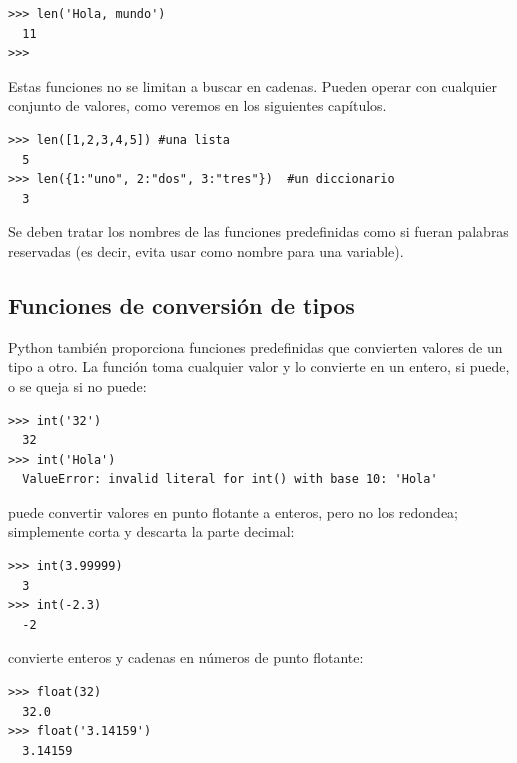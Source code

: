 \begin{Verbatim}[frame=single]
>>> len('Hola, mundo')
  11
>>>
\end{Verbatim}

Estas funciones no se limitan a buscar en cadenas. Pueden operar con
cualquier conjunto de valores, como veremos en los siguientes capítulos.

\begin{Verbatim}[frame=single]
>>> len([1,2,3,4,5]) #una lista
  5
>>> len({1:"uno", 2:"dos", 3:"tres"})  #un diccionario
  3
\end{Verbatim}

Se deben tratar los nombres de las funciones predefinidas como si fueran palabras reservadas (es decir, evita usar  como nombre para una variable).

\hypertarget{funciones-de-conversiuxf3n-de-tipos}{%
\subsection{Funciones de conversión de
tipos}\label{funciones-de-conversiuxf3n-de-tipos}}

 

Python también proporciona funciones predefinidas que convierten valores de
un tipo a otro. La función  toma cualquier valor y lo
convierte en un entero, si puede, o se queja si no puede:

 

\begin{Verbatim}[frame=single]
>>> int('32')
  32
>>> int('Hola')
  ValueError: invalid literal for int() with base 10: 'Hola'
\end{Verbatim}

 puede convertir valores en punto flotante a enteros, pero
no los redondea; simplemente corta y descarta la parte decimal:

\begin{Verbatim}[frame=single]
>>> int(3.99999)
  3
>>> int(-2.3)
  -2
\end{Verbatim}

 convierte enteros y cadenas en números de punto flotante:

 

\begin{Verbatim}[frame=single]
>>> float(32)
  32.0
>>> float('3.14159')
  3.14159
\end{Verbatim}

